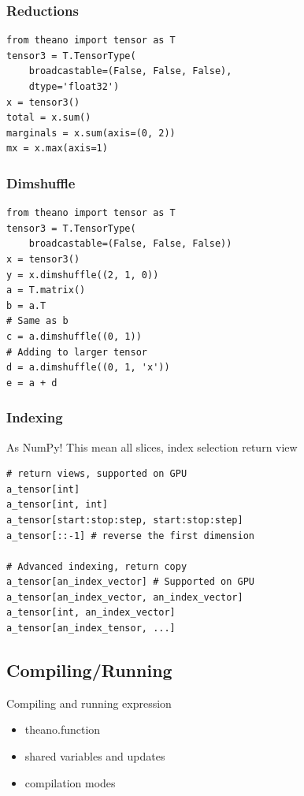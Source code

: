 \documentclass[utf8x,xcolor=pdftex,dvipsnames,table]{beamer}
\begin{document}
\begin{frame}[fragile]
  \frametitle{Reductions}
\begin{lstlisting}
from theano import tensor as T
tensor3 = T.TensorType(
    broadcastable=(False, False, False),
    dtype='float32')
x = tensor3()
total = x.sum()
marginals = x.sum(axis=(0, 2))
mx = x.max(axis=1)
\end{lstlisting}
\end{frame}

\begin{frame}[fragile]
  \frametitle{Dimshuffle}

\begin{lstlisting}
from theano import tensor as T
tensor3 = T.TensorType(
    broadcastable=(False, False, False))
x = tensor3()
y = x.dimshuffle((2, 1, 0))
a = T.matrix()
b = a.T
# Same as b
c = a.dimshuffle((0, 1))
# Adding to larger tensor
d = a.dimshuffle((0, 1, 'x'))
e = a + d
\end{lstlisting}
\end{frame}

\begin{frame}[fragile]
  \frametitle{Indexing}
  As NumPy!
  This mean all slices, index selection return view
\begin{lstlisting}
# return views, supported on GPU
a_tensor[int]
a_tensor[int, int]
a_tensor[start:stop:step, start:stop:step]
a_tensor[::-1] # reverse the first dimension

# Advanced indexing, return copy
a_tensor[an_index_vector] # Supported on GPU
a_tensor[an_index_vector, an_index_vector]
a_tensor[int, an_index_vector]
a_tensor[an_index_tensor, ...]
\end{lstlisting}
\end{frame}

\subsection{Compiling/Running}
\begin{frame}{Compiling and running expression}
  \begin{itemize}
  \item theano.function
  \item shared variables and updates
  \item compilation modes
  \end{itemize}
\end{frame}
\end{document}
